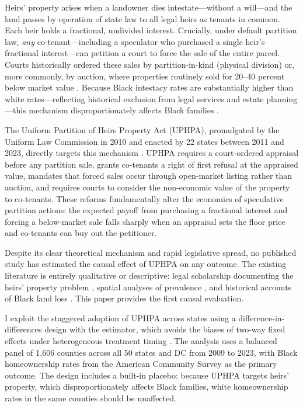 \documentclass[12pt]{article}
\begin{document}
Heirs' property arises when a landowner dies intestate---without a will---and the land passes by operation of state law to all legal heirs as tenants in common. Each heir holds a fractional, undivided interest. Crucially, under default partition law, \textit{any} co-tenant---including a speculator who purchased a single heir's fractional interest---can petition a court to force the sale of the entire parcel. Courts historically ordered these sales by partition-in-kind (physical division) or, more commonly, by auction, where properties routinely sold for 20--40 percent below market value \citep{mitchell2005, rivers2007}. Because Black intestacy rates are substantially higher than white rates---reflecting historical exclusion from legal services and estate planning---this mechanism disproportionately affects Black families \citep{way2009, deaton2022}.

The Uniform Partition of Heirs Property Act (UPHPA), promulgated by the Uniform Law Commission in 2010 and enacted by 22 states between 2011 and 2023, directly targets this mechanism \citep{ulc2010}. UPHPA requires a court-ordered appraisal before any partition sale, grants co-tenants a right of first refusal at the appraised value, mandates that forced sales occur through open-market listing rather than auction, and requires courts to consider the non-economic value of the property to co-tenants. These reforms fundamentally alter the economics of speculative partition actions: the expected payoff from purchasing a fractional interest and forcing a below-market sale falls sharply when an appraisal sets the floor price and co-tenants can buy out the petitioner.

Despite its clear theoretical mechanism and rapid legislative spread, no published study has estimated the causal effect of UPHPA on any outcome. The existing literature is entirely qualitative or descriptive: legal scholarship documenting the heirs' property problem \citep{mitchell2005, mitchell2019}, spatial analyses of prevalence \citep{deaton2022}, and historical accounts of Black land loss \citep{darity2003, gilbert2002}. This paper provides the first causal evaluation.

I exploit the staggered adoption of UPHPA across states using a difference-in-differences design with the \citet{callaway2021} estimator, which avoids the biases of two-way fixed effects under heterogeneous treatment timing \citep{goodmanbacon2021}. The analysis uses a balanced panel of 1,606 counties across all 50 states and DC from 2009 to 2023, with Black homeownership rates from the American Community Survey as the primary outcome. The design includes a built-in placebo: because UPHPA targets heirs' property, which disproportionately affects Black families, white homeownership rates in the same counties should be unaffected.
\end{document}
